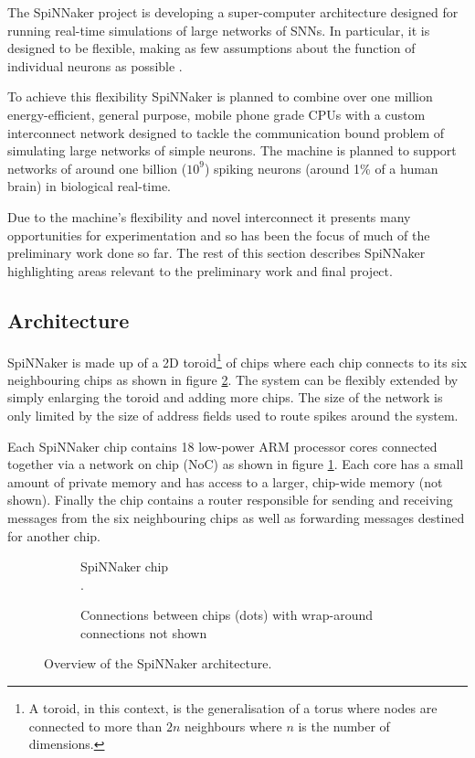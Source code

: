 		The SpiNNaker project is developing a super-computer architecture designed
		for running real-time simulations of large networks of SNNs. In particular,
		it is designed to be flexible, making as few assumptions about the function
		of individual neurons as possible \cite{furber06}.
		
		To achieve this flexibility SpiNNaker is planned to combine over one million
		energy-efficient, general purpose, mobile phone grade CPUs with a custom
		interconnect network designed to tackle the communication bound problem of
		simulating large networks of simple neurons. The machine is planned to
		support networks of around one billion ($10^9$) spiking neurons (around 1\%
		of a human brain) in biological real-time.
		
		Due to the machine's flexibility and novel interconnect it presents many
		opportunities for experimentation and so has been the focus of much of the
		preliminary work done so far. The rest of this section describes SpiNNaker
		highlighting areas relevant to the preliminary work and final project.
		
		\subsection{Architecture}
			
			SpiNNaker is made up of a 2D toroid\footnote{A toroid, in this context, is
			the generalisation of a torus where nodes are connected to more than $2n$
			neighbours where $n$ is the number of dimensions.} of chips where each
			chip connects to its six neighbouring chips as shown in figure
			\ref{fig:spinnaker-chips}. The system can be flexibly extended by simply
			enlarging the toroid and adding more chips. The size of the network is
			only limited by the size of address fields used to route spikes around the
			system.
			
			Each SpiNNaker chip contains 18 low-power ARM processor cores connected
			together via a network on chip (NoC) as shown in figure
			\ref{fig:spinnaker-chip}. Each core has a small amount of private memory
			and has access to a larger, chip-wide memory (not shown). Finally the chip
			contains a router responsible for sending and receiving messages from the
			six neighbouring chips as well as forwarding messages destined for another
			chip.
			
			\begin{figure}
				\center
				\begin{subfigure}[b]{0.49\textwidth}
					\center
					
					\caption{SpiNNaker chip\\\color{white}.}
					\label{fig:spinnaker-chip}
				\end{subfigure}
				\begin{subfigure}[b]{0.49\textwidth}
					\center
					
					\caption{Connections between chips (dots) with wrap-around
					connections not shown}
					\label{fig:spinnaker-chips}
				\end{subfigure}
				
				\caption{Overview of the SpiNNaker architecture.}
				\label{fig:spinnaker-architecture}
			\end{figure}
		
